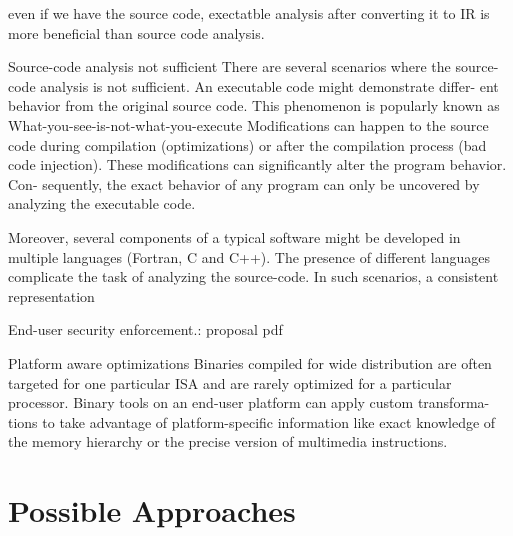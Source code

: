 \documentclass[mathserif,10pt]{beamer}
\begin{document}
{{  even if we have the source code, exectatble analysis after 
  converting it to IR is more beneficial than source code analysis.

  Source-code analysis not sufficient
    There are several scenarios where the source-code analysis is not
    sufficient.  An executable code might demonstrate differ- ent behavior from
    the original source code. This phenomenon is popularly known as
    What-you-see-is-not-what-you-execute 
    Modifications can happen to the source code during compilation
    (optimizations) or after the compilation process (bad code injection).
    These modifications can significantly alter the program behavior. Con-
    sequently, the exact behavior of any program can only be uncovered by
    analyzing the executable code.

    Moreover, several components of a typical software might be developed in
    multiple languages (Fortran, C and C++). The presence of different
    languages complicate the task of analyzing the source-code. In such
    scenarios, a consistent representation

  End-user security enforcement.: proposal pdf

  Platform aware optimizations
    Binaries compiled for wide distribution are often targeted for one
    particular ISA and are rarely optimized for a particular processor.  Binary
    tools on an end-user platform can apply custom transforma- tions to take
    advantage of platform-specific information like exact knowledge of the
    memory hierarchy or the precise version of multimedia instructions.
  
  }
}

\section{Possible Approaches}
\end{document}
